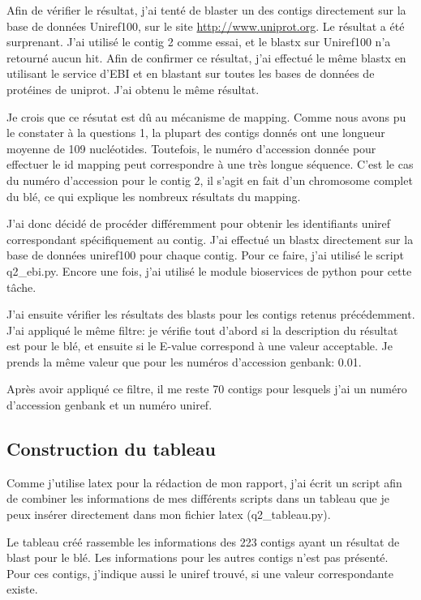 \documentclass[10.9pt]{article} %
\begin{document}
Afin de vérifier le résultat, j'ai tenté de blaster un des contigs directement sur la base de données Uniref100,
sur le site \url{http://www.uniprot.org}. Le résultat a été surprenant. J'ai utilisé le contig 2 comme essai,
et le blastx sur Uniref100 n'a retourné aucun hit. Afin de confirmer ce résultat, j'ai effectué le même blastx
en utilisant le service d'EBI et en blastant sur toutes les bases de données de protéines de uniprot. J'ai obtenu
le même résultat.

Je crois que ce résutat est dû au mécanisme de mapping. Comme nous avons pu le constater à la questions 1,
la plupart des contigs donnés ont une longueur moyenne de 109 nucléotides. Toutefois, le numéro d'accession
donnée pour effectuer le id mapping peut correspondre à une très longue séquence. C'est le cas du numéro
d'accession pour le contig 2, il s'agit en fait d'un chromosome complet du blé, ce qui explique les nombreux
résultats du mapping.

J'ai donc décidé de procéder différemment pour obtenir les identifiants uniref correspondant spécifiquement au contig.
J'ai effectué un blastx directement sur la base de données uniref100 pour chaque contig. Pour ce faire, j'ai utilisé
le script q2\_ebi.py. Encore une fois, j'ai utilisé le module bioservices de python pour cette tâche.

J'ai ensuite vérifier les résultats des blasts pour les contigs retenus précédemment. J'ai appliqué le même
filtre: je vérifie tout d'abord si la description du résultat est pour le blé, et ensuite si le E-value 
correspond à une valeur acceptable. Je prends la même valeur que pour les numéros d'accession genbank: 0.01.

Après avoir appliqué ce filtre, il me reste 70 contigs pour lesquels j'ai un numéro d'accession genbank et
un numéro uniref.

\subsection{Construction du tableau}

Comme j'utilise latex pour la rédaction de mon rapport, j'ai écrit un script afin de combiner les informations
de mes différents scripts dans un tableau que je peux insérer directement dans mon fichier latex (q2\_tableau.py).

Le tableau créé rassemble les informations des 223 contigs ayant un résultat de blast pour le blé. Les informations
pour les autres contigs n'est pas présenté. Pour ces contigs, j'indique aussi le uniref trouvé, si une valeur
correspondante existe.
\end{document}
